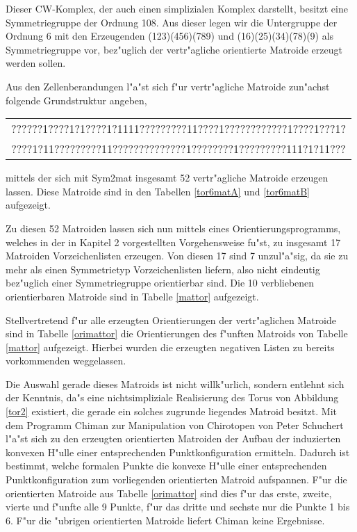 Dieser CW-Komplex, der auch einen simplizialen Komplex darstellt, besitzt
eine Symmetriegruppe der Ordnung 108. Aus dieser legen wir die Untergruppe der
Ordnung 6 mit den Erzeugenden (123)(456)(789) und (16)(25)(34)(78)(9) als
Symmetriegruppe vor, bez"uglich der vertr"agliche orientierte Matroide erzeugt
werden sollen.

Aus den Zellenberandungen l"a"st sich f"ur vertr"agliche Matroide zun"achst
folgende Grundstruktur angeben,

\begin{center}
{\footnotesize\tt\begin{tabular}{c}
??????1????1?1????1?1111?????????11????1????????????1????1???1?\\
????1?11?????????11??????????????1????????1?????????111?1?11???
\end{tabular}}
\end{center}

mittels der sich mit {\sc Sym2mat} insgesamt 52 vertr"agliche Matroide
erzeugen lassen. Diese Matroide sind in den Tabellen \ref{tor6matA}
und \ref{tor6matB} aufgezeigt.

Zu diesen 52 Matroiden lassen sich nun mittels eines Orientierungsprogramms,
welches in der in Kapitel 2 vorgestellten Vorgehensweise fu"st, zu insgesamt
17 Matroiden Vorzeichenlisten erzeugen. Von diesen 17 sind 7 unzul"a"sig,
da sie zu mehr als einen Symmetrietyp Vorzeichenlisten liefern, also nicht
eindeutig bez"uglich einer Symmetriegruppe orientierbar sind.
Die 10 verbliebenen orientierbaren Matroide sind in Tabelle \ref{mattor}
aufgezeigt.

Stellvertretend f"ur alle erzeugten Orientierungen der vertr"aglichen Matroide
sind in Tabelle \ref{orimattor} die Orientierungen des f"unften Matroids
von Tabelle \ref{mattor} aufgezeigt. Hierbei wurden die erzeugten negativen
Listen zu bereits vorkommenden weggelassen.

Die Auswahl gerade dieses Matroids ist nicht willk"urlich, sondern entlehnt
sich der Kenntnis, da"s eine nichtsimpliziale Realisierung des Torus von
Abbildung \ref{tor2} existiert, die gerade ein solches zugrunde liegendes
Matroid besitzt. Mit dem Programm {\sc Chiman} zur Manipulation von Chirotopen
von Peter Schuchert l"a"st sich zu den erzeugten orientierten Matroiden der
Aufbau der induzierten konvexen H"ulle einer entsprechenden Punktkonfiguration
ermitteln. Dadurch ist bestimmt, welche formalen Punkte die konvexe H"ulle einer
entsprechenden Punktkonfiguration zum vorliegenden orientierten Matroid
aufspannen. F"ur die orientierten Matroide aus Tabelle \ref{orimattor} sind
dies f"ur das erste, zweite, vierte und f"unfte alle 9 Punkte, f"ur das dritte
und sechste nur die Punkte 1 bis 6. F"ur die "ubrigen orientierten Matroide
liefert {\sc Chiman} keine Ergebnisse.

